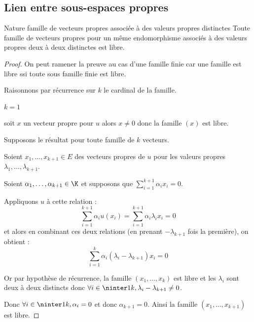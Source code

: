 \subsection{Lien entre sous-espaces propres }

\begin{theorement}{Nature famille de vecteurs propres associée à des valeurs propres distinctes}{}
    Toute famille de vecteurs propres pour un même endomorphisme 
    associés à des valeurs propres deux à deux distinctes est libre. 
\end{theorement}


\begin{proof}
    On peut ramener la preuve au cas d'une famille finie car une famille est libre 
    ssi toute sous famille finie est libre. 

    Raisonnons par récurrence sur $k$ le cardinal de la famille. 

     $k = 1$

    \svspace soit $x$ un vecteur propre pour $u$ alors $x \neq 0$ donc la famille $(x)$ est libre.

     Supposons le résultat pour toute famille de $k$ vecteurs. 

    \svspace Soient $x_1, \ldots, x_{k + 1} \in E$ des vecteurs propres de $u$ pour les 
    valeurs propres $\lambda_1, \ldots, \lambda_{k + 1}$.

    Soient $\alpha_1, \ldots, \alpha_{k + 1} \in \K$ et supposons que 
    $\displaystyle \sum_{i = 1}^{k + 1} \alpha_i x_i = 0$.

    Appliquons $u$ à cette relation :
    \[
        \sum_{i = 1}^{k + 1} \alpha_i u(x_i) = \sum_{i = 1}^{k + 1} \alpha_i \lambda_i x_i = 0
    \]
    et alors en combinant ces deux relations (en prenant $- \lambda_{k+1}$ fois la première), on obtient :
    \[
        \sum_{i = 1}^{k} \alpha_i (\lambda_i - \lambda_{k + 1}) x_i = 0
    \]

    Or par hypothèse de récurrence, la famille $(x_1, \ldots, x_k)$ est libre et 
    les $\lambda_i$ sont deux à deux distincts donc $\forall i \in \ninter 1 k, \lambda_i - \lambda_{k + 1} \neq 0$.

    Donc $\forall i \in \ninter 1 k, \alpha_i = 0$ et donc $\alpha_{k + 1} = 0$. 
    Ainsi la famille $(x_1, \ldots, x_{k + 1})$ est libre.
\end{proof}

